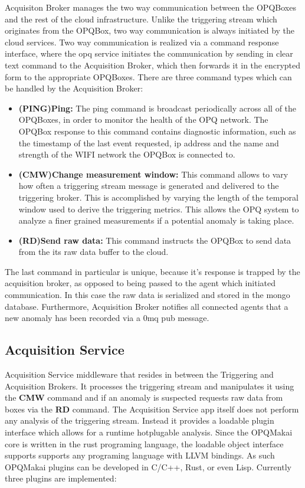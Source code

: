 Acquisiton Broker manages the two way communication between the OPQBoxes and the rest of the cloud infrastructure. Unlike the triggering stream which originates from the OPQBox, two way communication is always initiated by the cloud services. Two way communication is realized via a command response interface, where the opq service initiates the communication by sending in clear text command to the Acquisition Broker, which then forwards it in the encrypted form to the appropriate OPQBoxes. There are three command types which can be handled by the Acquisition Broker:
\begin{itemize}
\item{\textbf{(PING)Ping:}} The ping command is broadcast periodically across all of the OPQBoxes, in order to monitor the health of the OPQ network. The OPQBox response to this command contains diagnostic information, such as the timestamp of the last event requested, ip address and the name and strength of the WIFI network the OPQBox is connected to.
\item{\textbf{(CMW)Change measurement window:}} This command allows to vary how often a triggering stream message is generated and delivered to the triggering broker. This is accomplished by varying the length of the temporal window used to derive the triggering metrics. This allows the OPQ system to analyze a finer grained measurements if a potential anomaly is taking place. 

\item{\textbf{(RD)Send raw data:}} This command instructs the OPQBox to send data from the its raw data buffer to the cloud. 
\end{itemize}

The last command in particular is unique, because it's response is trapped by the acquisition broker, as opposed to being passed to the agent which initiated communication. In this case the raw data is serialized and stored in the mongo database. Furthermore, Acquisition Broker notifies all connected agents that a new anomaly has been recorded via a 0mq pub message.

\subsection{Acquisition Service}

Acquisition Service middleware that resides in between the Triggering and Acquisition Brokers. It processes the triggering stream and manipulates it using the \textbf{CMW} command and if an anomaly is suspected requests raw data from boxes via the \textbf{RD} command. The Acquisition Service app itself does not perform any analysis of the triggering stream. Instead it provides a loadable plugin interface which allows for a runtime hotplugable analysis. Since the OPQMakai core is written in the rust programing language, the loadable object interface supports supports any programing language with LLVM bindings. As such OPQMakai plugins can be developed in C/C++, Rust, or even Lisp. Currently three plugins are implemented:

